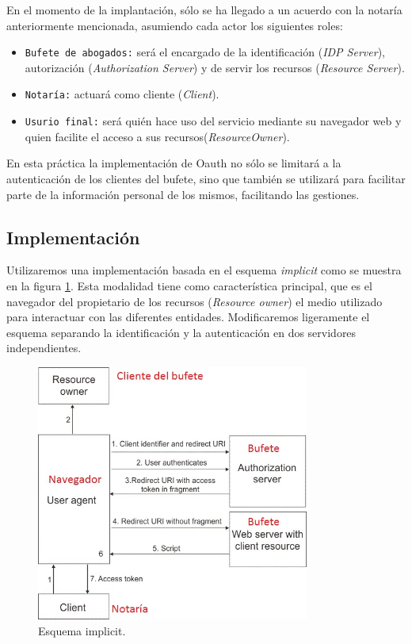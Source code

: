 \documentclass[a4,12pt,onecolum]{article}
\begin{document}
En el momento de la implantación, sólo se ha llegado a un acuerdo con la notaría anteriormente mencionada, asumiendo cada actor los siguientes roles:

\begin{itemize}
\item \texttt{Bufete de abogados:} será el encargado de la identificación (\emph{IDP Server}), autorización (\emph{Authorization Server}) y de servir los recursos (\emph{Resource Server}).
\item \texttt{Notaría:} actuará como cliente (\emph{Client}).
\item \texttt{Usurio final:} será quién hace uso del servicio mediante su navegador web y quien facilite el acceso a sus recursos(\emph{ResourceOwner}).
\end{itemize}

En esta práctica la implementación de Oauth no sólo se limitará a la autenticación de los clientes del bufete, sino que también se utilizará para facilitar parte de la información personal de los mismos, facilitando las gestiones.


\subsection{Implementación}
Utilizaremos una implementación basada en el esquema \emph{implicit} como se muestra en la figura \ref{fig:oauth1}. Esta modalidad tiene como característica principal, que es el navegador del propietario de los recursos (\emph{Resource owner}) el medio utilizado para interactuar con las diferentes entidades. Modificaremos ligeramente el esquema separando la identificación y la autenticación en dos servidores independientes.	\\

\begin{figure}[htbp]
\centering
\includegraphics[width=0.8\textwidth]{./images/oauth/implicit.jpg}
\caption{Esquema implicit.}
\label{fig:oauth1}
\end{figure}
\end{document}
